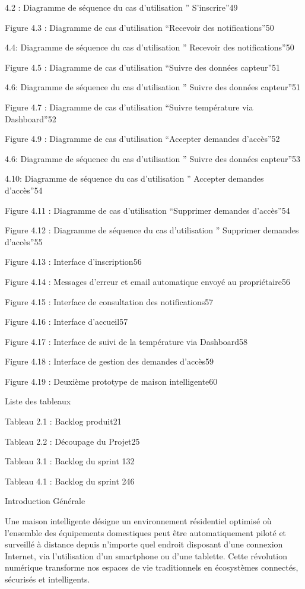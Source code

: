 \documentclass{article}
\begin{document}
4.2 : Diagramme de séquence du cas d’utilisation ” S’inscrire”49

Figure 4.3 : Diagramme de cas d’utilisation “Recevoir des notifications”50

4.4: Diagramme de séquence du cas d’utilisation ” Recevoir des notifications”50

Figure 4.5 : Diagramme de cas d’utilisation “Suivre des données capteur”51

4.6: Diagramme de séquence du cas d’utilisation ” Suivre des données capteur”51

Figure 4.7 : Diagramme de cas d’utilisation “Suivre température via Dashboard”52

Figure 4.9 : Diagramme de cas d’utilisation “Accepter demandes d’accès”52

4.6: Diagramme de séquence du cas d’utilisation ” Suivre des données capteur”53

4.10: Diagramme de séquence du cas d’utilisation ” Accepter demandes d’accès”54

Figure 4.11 : Diagramme de cas d’utilisation “Supprimer demandes d’accès”54

Figure 4.12 : Diagramme de séquence du cas d’utilisation ” Supprimer demandes d’accès”55

Figure 4.13 : Interface d’inscription56

Figure 4.14 : Messages d’erreur et email automatique envoyé au propriétaire56

Figure 4.15 : Interface de consultation des notifications57

Figure 4.16 : Interface d’accueil57

Figure 4.17 : Interface de suivi de la température via Dashboard58

Figure 4.18 : Interface de gestion des demandes d’accès59

Figure 4.19 : Deuxième prototype de maison intelligente60

Liste des tableaux

Tableau 2.1 : Backlog produit21

Tableau 2.2 :  Découpage du Projet25

Tableau 3.1 : Backlog du sprint 132

Tableau 4.1 : Backlog du sprint 246

Introduction Générale

Une maison intelligente désigne un environnement résidentiel optimisé où l'ensemble des équipements domestiques peut être automatiquement piloté et surveillé à distance depuis n'importe quel endroit disposant d'une connexion Internet, via l'utilisation d'un smartphone ou d'une tablette. Cette révolution numérique transforme nos espaces de vie traditionnels en écosystèmes connectés, sécurisés et intelligents.
\end{document}
